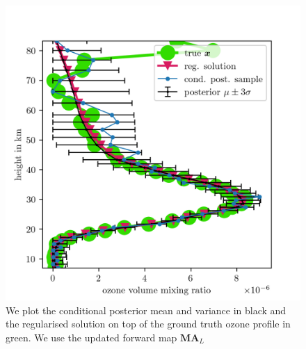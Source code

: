 \begin{figure}[ht!]
	\centering
	\includegraphics{SecRecResinclRegandSampl.png}
	\caption[Ozone posterior mean and variance and the regularised solution compared to the ground truth.]{We plot the conditional posterior mean and variance in black and the regularised solution on top of the ground truth ozone profile in green. We use the updated forward map $\bm{M}\bm{A}_L$}
	\label{fig:O3SolplsReg}
\end{figure}




